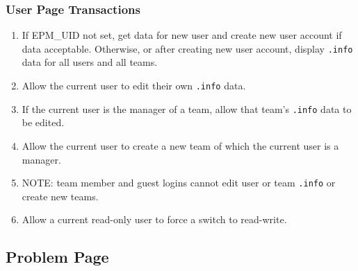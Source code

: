 \documentclass[12pt]{article}
\begin{document}
\subsubsection{User Page Transactions}

\begin{enumerate}
\item If EPM\_UID not set, get data for new user and create
      new user account if data acceptable.  Otherwise, or
      after creating new user account, display {\tt .info}
      data for all users and all teams.
\item Allow the current user to edit their own {\tt .info} data.
\item If the current user is the manager of a team, allow that
      team's {\tt .info} data to be edited.
\item Allow the current user to create a new team of which the
      current user is a manager.
\item NOTE: team member and guest logins cannot edit user or
      team {\tt .info} or create new teams.
\item Allow a current read-only user to force a switch to read-write.
\end{enumerate}

\newpage

\subsection{Problem Page}
\end{document}
